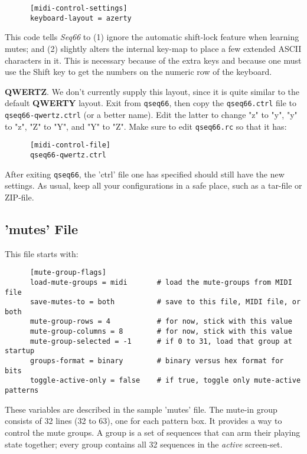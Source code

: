    \begin{verbatim}
      [midi-control-settings]
      keyboard-layout = azerty
   \end{verbatim}

   This code tells \textsl{Seq66} to (1) ignore the automatic shift-lock
   feature when learning mutes; and (2) slightly alters the internal key-map to
   place a few extended ASCII characters in it.  This is necessary because of
   the extra keys and because one must use the Shift key to get the numbers on
   the numeric row of the keyboard.

   \textbf{QWERTZ}.
   We don't currently supply this layout, since it is quite similar to the default
   \textbf{QWERTY} layout.
   Exit from \texttt{qseq66}, then copy the \texttt{qseq66.ctrl}
   file to \texttt{qseq66-qwertz.ctrl} (or a better name).  Edit the latter to
   change "z" to "y", "y" to "z", "Z" to "Y", and "Y" to "Z".
   Make sure to edit \texttt{qseq66.rc} so that it has:

   \begin{verbatim}
      [midi-control-file]
      qseq66-qwertz.ctrl
   \end{verbatim}

   After exiting \texttt{qseq66}, the 'ctrl' file one has specified
   should still have the new settings.
   As usual, keep all your configurations in a safe place, such as a tar-file or
   ZIP-file.

\subsection{'mutes' File}
\label{subsubsec:configuration_mute_group_control}

   This file starts with:

   \begin{verbatim}
      [mute-group-flags]
      load-mute-groups = midi       # load the mute-groups from MIDI file
      save-mutes-to = both          # save to this file, MIDI file, or both
      mute-group-rows = 4           # for now, stick with this value
      mute-group-columns = 8        # for now, stick with this value
      mute-group-selected = -1      # if 0 to 31, load that group at startup
      groups-format = binary        # binary versus hex format for bits
      toggle-active-only = false    # if true, toggle only mute-active patterns
   \end{verbatim}

   These variables are described in the sample 'mutes' file.
   The mute-in group consists of 32 lines (32 to 63), one for each
   pattern box.
   It provides a way to control the mute groups.
   A group is a set of sequences that can arm their playing state
   together; every group contains all 32 sequences in the
   \textsl{active} screen-set.

